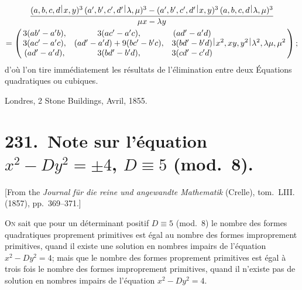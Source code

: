 \documentclass[11pt,a4paper]{book}
\theoremstyle{plain}
\newcommand{\wrule}{\hspace{-0.1em}\mid\hspace{-0.1em}}
\begin{document}
\begin{multline*}
\frac{(a,b,c,d\,\raisebox{0.5ex}{$\wrule$}\,x,y)^3\,(a',b',c',d'\,\raisebox{0.5ex}{$\wrule$}\,\lambda,\mu)^3-(a',b',c',d'\,\raisebox{0.5ex}{$\wrule$}\,x,y)^3\,(a,b,c,d\,\raisebox{0.5ex}{$\wrule$}\,\lambda,\mu)^3}{\mu x-\lambda y}\\
=\left(\,\begin{matrix} 3(ab'-a'b), & 3(ac'-a'c), & (ad'-a'd)\\
3(ac'-a'c), & (ad'-a'd)+9(bc'-b'c), & 3(bd'-b'd)\\
(ad'-a'd), & 3(bd'-b'd), & 3(cd'-c'd)\end{matrix}\,\raisebox{0.5ex}{$\wrule$}\,x^2,xy,y^2\,\raisebox{0.5ex}{$\wrule$}\,\lambda^2,\lambda\mu,\mu^2\,\right);
\end{multline*}
d'o\`{u} l'on tire imm\'{e}diatement les r\'{e}sultats de l'\'{e}limination entre deux \'{E}quations quadratiques ou cubiques.

\begin{flushright}
Londres, 2 Stone Buildings, Avril, 1855.
\end{flushright}
\newpage

\chapter[Note sur l'\'{e}quation $x^2-Dy^2=\pm4$, $D\equiv5$ (mod.~8)]{231.\ Note sur l'\'{e}quation $x^2-Dy^2=\pm4$, $D\equiv5$ (mod.~8).}
\label{paper231}

\begin{center}
\small
[From the \textit{Journal f\"{u}r die reine und angewandte Mathematik} (Crelle), tom.~LIII. (1857), pp.~369--371.]
\end{center}

\bigskip

\textsc{On} sait que pour un d\'{e}terminant positif $D\equiv5$ (mod.~8) le nombre des formes quadratiques proprement primitives est \'{e}gal au nombre des formes improprement primitives, quand il existe une solution en nombres impairs de l'\'{e}quation $x^2-Dy^2=4$; mais que le nombre des formes proprement primitives est \'{e}gal \`{a} trois fois le nombre des formes improprement primitives, quand il n'existe pas de solution en nombres impairs de l'\'{e}quation $x^2-Dy^2=4$.
\end{document}
